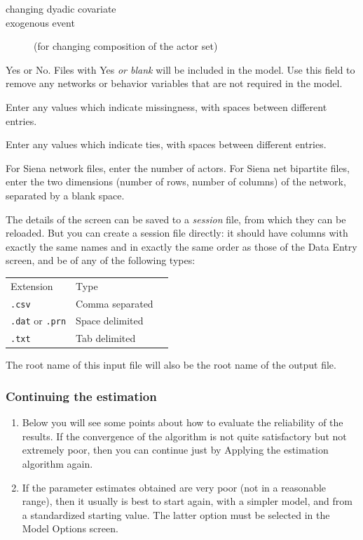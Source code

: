 \documentclass[a4paper,fleqn,11pt]{article}
\newcommand{\+}{\, + \,}
\newcommand{\sfn}[1]{\textsf{#1}}
\begin{document}
{\begin{description}
\begin{description}
\item[\sfn{changing dyadic covariate}]
\item[\sfn{exogenous event}] (for changing composition of the actor set)
\end{description}
\item[\sfn{Selected}] Yes or No. Files with \sfn{Yes} \emph{or blank} will be
included in the model. Use this field to remove any networks or behavior
variables that are not required in the model.
\item[\sfn{Missing Values}] Enter any values which indicate missingness, with
  spaces between different entries.
\item[\sfn{Nonzero Codes}] Enter any values which indicate ties, with spaces
  between different entries.
\item[\sfn{NbrOfActors}] For \sfn{Siena network files}, enter the number of
  actors. For \sfn{Siena net bipartite files}, enter the two dimensions
  (number of rows, number of columns) of the network, separated by a blank space.
 \end{description}

 The details of the screen can be saved to a \emph{session} file, from which
 they can be reloaded. But you can create a session file directly: it should
 have columns with exactly the same names and in exactly the same order as those
 of the \sfn{Data Entry} screen, and be of any of the following types:
\begin{center}
\begin{tabular}{lll}\\
Extension&Type\\
\texttt{.csv}&Comma separated\\
\texttt{.dat} or \texttt{.prn}&Space delimited\\
\texttt{.txt}&Tab delimited\\
\end{tabular}
\end{center}

\noindent
The root name of this input file will also be the root name of the output file.

\subsubsection{Continuing the estimation}
\begin{enumerate}
\item Below you will see some points about how to evaluate the reliability of
  the results.  If the convergence of the algorithm is not quite satisfactory
  but not extremely poor, then you can continue just by \textsf{Apply}ing the
  estimation algorithm again.
\item If the parameter estimates obtained are very poor (not in a reasonable
  range), then it usually is best to start again, with a simpler model, and from
  a standardized starting value.  The latter option must be selected in the
  \textsf{Model Options} screen.
\end{enumerate}


}
\end{document}
